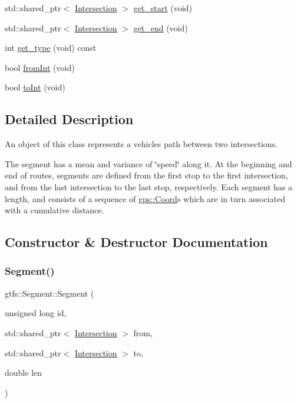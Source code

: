 \begin{DoxyCompactItemize}
\item 
std\+::shared\+\_\+ptr$<$ \hyperlink{classgtfs_1_1Intersection}{Intersection} $>$ \hyperlink{classgtfs_1_1Segment_a8f64f5b0859e79e9bdd2c0faa7e50e23}{get\+\_\+start} (void)
\item 
std\+::shared\+\_\+ptr$<$ \hyperlink{classgtfs_1_1Intersection}{Intersection} $>$ \hyperlink{classgtfs_1_1Segment_a13181832822c8780ab7c944d2fea2a66}{get\+\_\+end} (void)
\item 
int \hyperlink{classgtfs_1_1Segment_a366d9b1437e4175c3f43d312fab09530}{get\+\_\+type} (void) const
\item 
bool \hyperlink{classgtfs_1_1Segment_aa6d202be9bccb10ebd3c9274b7ab9e0c}{from\+Int} (void)
\item 
bool \hyperlink{classgtfs_1_1Segment_a2b289f1a504fcd1912e588525fc46a41}{to\+Int} (void)
\end{DoxyCompactItemize}


\subsection{Detailed Description}
An object of this class represents a vehicles path between two intersections.

The segment has a mean and variance of \char`\"{}speed\char`\"{} along it. At the beginning and end of routes, segments are defined from the first stop to the first intersection, and from the last intersection to the last stop, respectively. Each segment has a length, and consists of a sequence of \hyperlink{classgps_1_1Coord}{gps\+::\+Coord}\textquotesingle{}s which are in turn associated with a cumulative distance. 

\subsection{Constructor \& Destructor Documentation}
\mbox{\label{classgtfs_1_1Segment_a3ffae4434816b887aaa0ad599ca1776a}} 
\subsubsection{\texorpdfstring{Segment()}{Segment()}\hspace{0.1cm}{\footnotesize\ttfamily [1/4]}}
{\footnotesize\ttfamily gtfs\+::\+Segment\+::\+Segment (\begin{DoxyParamCaption}\item[{unsigned long}]{id,  }\item[{std\+::shared\+\_\+ptr$<$ \hyperlink{classgtfs_1_1Intersection}{Intersection} $>$}]{from,  }\item[{std\+::shared\+\_\+ptr$<$ \hyperlink{classgtfs_1_1Intersection}{Intersection} $>$}]{to,  }\item[{double}]{len }\end{DoxyParamCaption})\hspace{0.3cm}{\ttfamily [inline]}}

